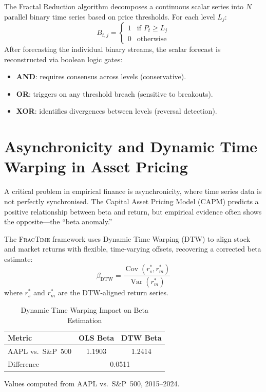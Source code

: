 \documentclass[12pt,a4paper]{article}
\begin{document}
The Fractal Reduction algorithm decomposes a continuous scalar series into
$N$ parallel binary time series based on price thresholds.  For each level
$L_j$:
\begin{equation}
  B_{t,j} = \begin{cases} 1 & \text{if } P_t \geq L_j \\ 0 & \text{otherwise} \end{cases}
  \label{eq:binary}
\end{equation}
After forecasting the individual binary streams, the scalar forecast is
reconstructed via boolean logic gates:
\begin{itemize}
  \item \textbf{AND}: requires consensus across levels (conservative).
  \item \textbf{OR}: triggers on any threshold breach (sensitive to breakouts).
  \item \textbf{XOR}: identifies divergences between levels (reversal detection).
\end{itemize}

\section{Asynchronicity and Dynamic Time Warping in Asset Pricing}
\label{sec:dtw}

A critical problem in empirical finance is asynchronicity, where time series
data is not perfectly synchronised.  The Capital Asset Pricing Model (CAPM)
predicts a positive relationship between beta and return, but empirical
evidence often shows the opposite---the ``beta anomaly.''

The \textsc{FracTime} framework uses Dynamic Time Warping (DTW) to align
stock and market returns with flexible, time-varying offsets, recovering a
corrected beta estimate:
\begin{equation}
  \beta_{\mathrm{DTW}} =
    \frac{\operatorname{Cov}(r_s^*, r_m^*)}{\operatorname{Var}(r_m^*)}
  \label{eq:dtw_beta}
\end{equation}
where $r_s^*$ and $r_m^*$ are the DTW-aligned return series.

\begin{table}[htbp]
  \centering
  \caption{Dynamic Time Warping Impact on Beta Estimation}
  \label{tab:dtw_beta}
  \begin{threeparttable}
  \begin{tabular}{lcc}
    \toprule
    \textbf{Metric} & \textbf{OLS Beta} & \textbf{DTW Beta} \\
    \midrule
    AAPL vs.\ S\&P~500 & 1.1903 & 1.2414 \\
    Difference          & \multicolumn{2}{c}{0.0511} \\
    \bottomrule
  \end{tabular}
  \begin{tablenotes}\small
    \item Values computed from AAPL vs.\ S\&P~500, 2015--2024.
  \end{tablenotes}
  \end{threeparttable}
\end{table}
\end{document}
